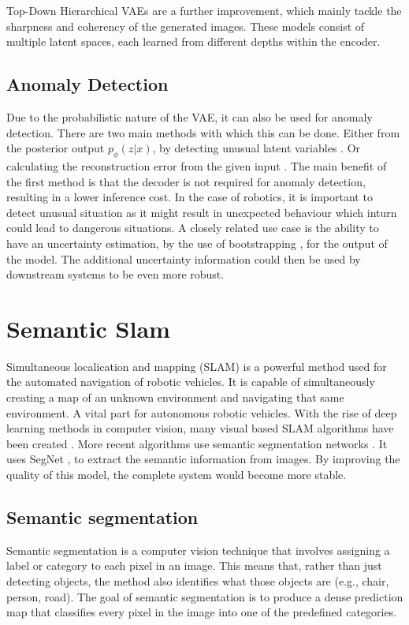 Top-Down Hierarchical VAEs \cite{maaloe2019biva,NIPS2016_6ae07dcb,vahdat2020nvae} are a further improvement, which mainly tackle the sharpness and coherency of the generated images. These models consist of multiple latent spaces, each learned from different depths within the encoder.

\subsection{Anomaly Detection}
Due to the probabilistic nature of the VAE, it can also be used for anomaly detection. There are two main methods with which this can be done. Either from the posterior output $p_{\phi}(z|x)$, by detecting unusual latent variables \cite{marimont2020anomalydetectionlatentspace,angiulli2020improving,angiulli2023latent}. Or calculating the reconstruction error from the given input \cite{an2015variational, zhou2020unsupervisedanomalylocalizationusing, gouda2022unsupervised}. The main benefit of the first method is that the decoder is not required for anomaly detection, resulting in a lower inference cost. In the case of robotics, it is important to detect unusual situation as it might result in unexpected behaviour which inturn could lead to dangerous situations.
A closely related use case is the ability to have an uncertainty estimation, by the use of bootstrapping \cite{chen2018use,kohl2018probabilistic}, for the output of the model. The additional uncertainty information could then be used by downstream systems to be even more robust.

\section{Semantic Slam}
Simultaneous localication and mapping (SLAM)\cite{chatila1985position} is a powerful method used for the automated navigation of robotic vehicles. It is capable of simultaneously creating a map of an unknown environment and navigating that same environment. A vital part for autonomous robotic vehicles. With the rise of deep learning methods in computer vision, many visual based SLAM algorithms have been created \cite{taketomi2017visual}. More recent algorithms use semantic segmentation networks \cite{yu2018ds}. It uses SegNet \cite{badri2017segnet}, to extract the semantic information from images. By improving the quality of this model, the complete system would become more stable.

\subsection{Semantic segmentation}
Semantic segmentation is a computer vision technique that involves assigning a label or category to each pixel in an image. This means that, rather than just detecting objects, the method also identifies what those objects are (e.g., chair, person, road). The goal of semantic segmentation is to produce a dense prediction map that classifies every pixel in the image into one of the predefined categories.

